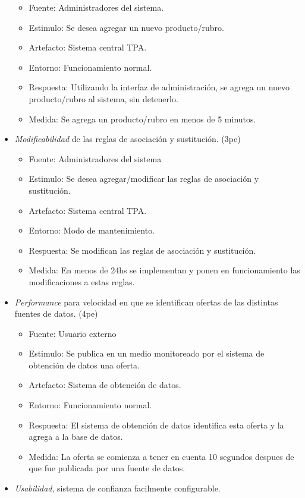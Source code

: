 \begin{itemize}
  \begin{itemize}
  \item
    Fuente: Administradores del sistema.
  \item
    Estimulo: Se desea agregar un nuevo producto/rubro.
  \item
    Artefacto: Sistema central TPA.
  \item
    Entorno: Funcionamiento normal.
  \item
    Respuesta: Utilizando la interfaz de administración, se agrega un
    nuevo producto/rubro al sistema, sin detenerlo.
  \item
    Medida: Se agrega un producto/rubro en menos de 5 minutos.
  \end{itemize}
\item
  \emph{Modificabilidad} de las reglas de asociación y sustitución.
  (3pe)

  \begin{itemize}
  \item
    Fuente: Administradores del sistema
  \item
    Estimulo: Se desea agregar/modificar las reglas de asociación y
    sustitución.
  \item
    Artefacto: Sistema central TPA.
  \item
    Entorno: Modo de mantenimiento.
  \item
    Respuesta: Se modifican las reglas de asociación y sustitución.
  \item
    Medida: En menos de 24hs se implementan y ponen en funcionamiento
    las modificaciones a estas reglas.
  \end{itemize}
\item
  \emph{Performance} para velocidad en que se identifican ofertas de las
  distintas fuentes de datos. (4pe)

  \begin{itemize}
  \item
    Fuente: Usuario externo
  \item
    Estimulo: Se publica en un medio monitoreado por el sistema de
    obtención de datos una oferta.
  \item
    Artefacto: Sistema de obtención de datos.
  \item
    Entorno: Funcionamiento normal.
  \item
    Respuesta: El sistema de obtención de datos identifica esta oferta y
    la agrega a la base de datos.
  \item
    Medida: La oferta se comienza a tener en cuenta 10 segundos despues
    de que fue publicada por una fuente de datos.
  \end{itemize}
\item
  \emph{Usabilidad}, sistema de confianza facilmente configurable.


\end{itemize}
